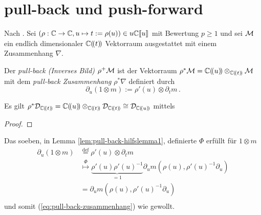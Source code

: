 \section{pull-back und push-forward}
\begin{comment}
\cite[1.3]{hotta2007d}
\end{comment}

Nach \cite[1.a]{sabbah_Fourier-local}. Sei $(\rho:\mathbb{C}\rightarrow \mathbb{C} , u\mapsto
t:=\rho(u))\in u{\mathbb C\llbracket u\rrbracket}$ mit Bewertung $p\geq1$ und sei $\mathcal{M}$ ein endlich
dimensionaler $\mathbb{C}(\!(t)\!)$ Vektorraum ausgestattet mit einem Zusammenhang
$\nabla$.
\begin{defn} \label{defn:pull-back}
\cite[1.a]{sabbah_Fourier-local}
Der \emph{pull-back (Inverses Bild)} $\rho^{+}\mathcal{M}$ ist der Vektorraum
$\rho^{*}\mathcal{M}=\mathbb{C}(\!(u)\!)\otimes_{\mathbb{C}(\!(t)\!)}\mathcal{M}$ mit dem \emph{pull-back
Zusammenhang} $\rho^*\nabla$ definiert durch 
\begin{equation} \label{eq:pull-back-zusammenhang}
\partial_u(1\otimes m):=\rho'(u)\otimes\partial_tm \,.
\end{equation}
\end{defn}
%
\begin{lem} \label{lem:pull-back-hilfslemma1}
\def\myT{\cD_{\Cftl}}
\def\myU{\cD_{\Cful}}
Es gilt $\rho^*\myT=\Cful\otimes_{\Cftl}\myT \cong \myU$ mittels
\begin{center}
\end{center}
\end{lem}
\begin{proof}
\end{proof}
\begin{bem}
Das soeben, in Lemma \ref{lem:pull-back-hilfslemma1}, definierte $\Phi$ erfüllt
für $1\otimes m$
\begin{align*}
\partial_u(1\otimes m) &\overset{\mbox{def}}{=} \rho'(u)\otimes\partial_t m \\
&\overset{\Phi}{\mapsto} \underset{=1}{\underbrace{\rho'(u)\rho'(u)^{-1}}}
  \partial_u m(\rho(u),\rho'(u)^{-1}\partial_u) \\
&= \partial_u m(\rho(u),\rho'(u)^{-1}\partial_u)\\
\end{align*}
und somit (\ref{eq:pull-back-zusammenhang}) wie gewollt.
\end{bem}

